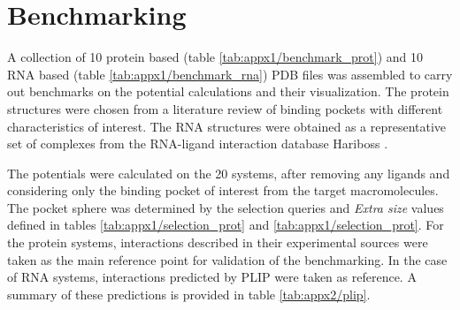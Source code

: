 \section{Benchmarking}
  A collection of 10 protein based (table \ref{tab:appx1/benchmark_prot}) and 10 RNA based (table \ref{tab:appx1/benchmark_rna}) PDB files was assembled to carry out benchmarks on the potential calculations and their visualization. The protein structures were chosen from a literature review of binding pockets with different characteristics of interest. The RNA structures were obtained as a representative set of complexes from the RNA-ligand interaction database Hariboss \cite{hariboss_2022}.

  The potentials were calculated on the 20 systems, after removing any ligands and considering only the binding pocket of interest from the target macromolecules. The pocket sphere was determined by the selection queries and \textit{Extra size} values defined in tables \ref{tab:appx1/selection_prot} and \ref{tab:appx1/selection_prot}. For the protein systems, interactions described in their experimental sources were taken as the main reference point for validation of the benchmarking. In the case of RNA systems, interactions predicted by PLIP \cite{plip_2021} were taken as reference. A summary of these predictions is provided in table \ref{tab:appx2/plip}.

